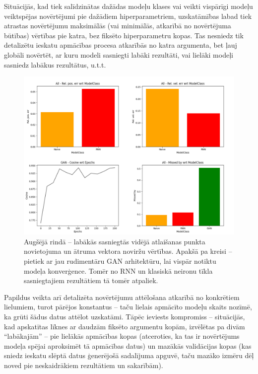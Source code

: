 \documentclass[12pt, a4paper]{article}
\numberwithin{equation}{section} %
\begin{document}
Situācijās, kad tiek salīdzinātas dažādas modeļu klases vai veikti vispārīgi modeļu veiktspējas novērtējumi pie dažādiem hiperparametriem, uzskatāmības labad tiek atrastas novērtējumu maksimālās (vai minimālās, atkarībā no novērtējuma būtības) vērtības pie katra, bez fiksēto hiperparametru kopas. Tas nesniedz tik detalizētu ieskatu apmācības procesa atkarībās no katra argumenta, bet ļauj globāli novērtēt, ar kuru modeli sasniegti labāki rezultāti, vai lielāki modeļi sasniedz labākus rezultātus, u.t.t. 

\begin{figure}[t!]
    \centering
    \includegraphics[width=16cm,page=1]{../img/throw_metrics_gan.png}
    \caption{Augšējā rindā -- labākās sasniegtās vidējā atlaišanas punkta novietojuma un ātruma vektora noviržu vērtības. Apakšā pa kreisi -- pietiek ar jau rudimentāru GAN arhitektūru, lai vispār notiktu modeļa konverģence. Tomēr no RNN un klasiskā neironu tīkla sasniegtajiem rezultātiem tā tomēr atpaliek.}
\end{figure}

Papildus veikta arī detalizēta novērtējumu attēlošana atkarībā no konkrētiem lielumiem, turot pārējos konstantus -- taču lielais apmācīto modeļu skaits nozīmē, ka grūti šādus datus attēlot uzskatāmi. Tāpēc ieviests kompromiss -- situācijās, kad apskatītas līknes ar daudzām fiksēto argumentu kopām, izvēlētas pa divām ``labākajām'' -- pie lielākās apmācības kopas (atceroties, ka tas ir novērtējums modeļa spējai aproksimēt tā apmācības datus) un mazākās validācijas kopas (kas sniedz ieskatu slēptā datus ģenerējošā sadalījuma apguvē, taču mazāko izmēru dēļ noved pie neskaidrākiem rezultātiem un sakarībām).
\end{document}
